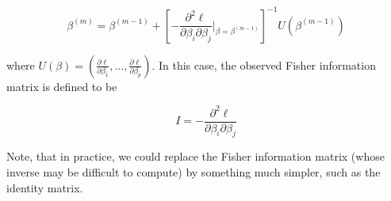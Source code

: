 $$\beta^{(m)} = \beta^{(m-1)} + \left[ - \frac{\partial^2 \ell}{\partial \beta_i \partial \beta_j} \Big\vert_{\beta = \beta^{(m-1)}} \right]^{-1} U\left(\beta^{(m-1)} \right)$$

where $U(\beta) = \left( \frac{\partial \ell}{\partial \beta_1}, ..., \frac{\partial \ell}{\partial \beta_p} \right)$. In this case, the observed Fisher information matrix is defined to be

$$I = - \frac{\partial^2 \ell}{\partial \beta_i \partial \beta_j}$$

Note, that in practice, we could replace the Fisher information matrix (whose inverse may be difficult to compute) by something much simpler, such as the identity matrix.
